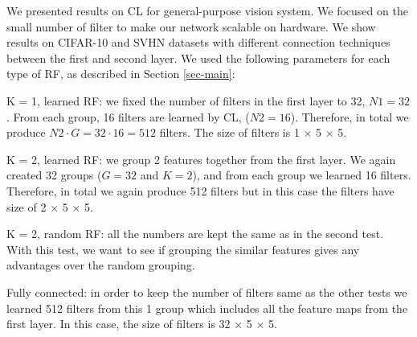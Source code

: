 \documentclass{article} %
\begin{document}
We presented results on CL for general-purpose vision system. We focused on the small number of filter to make our network scalable on hardware. We show results on CIFAR-10 and SVHN datasets with different connection techniques between the first and second layer.  We used the following parameters for each type of RF, as described in Section \ref{sec-main}:

K = 1, learned RF: we fixed the number of filters in the first layer to 32, $N1=32$. From each group, 16 filters are learned by CL, ($N2 = 16$). Therefore, in total we produce $N2 \cdot G = 32 \cdot 16 = 512$ filters. The size of filters is 1 $\times$ 5 $\times$ 5. 

K = 2, learned RF: we group 2 features together from the first layer. We again created 32 groups ($G = 32$ and $K = 2$), and from each group we learned 16 filters. Therefore, in total we again produce 512 filters but in this case the filters have size of 2 $\times$ 5 $\times$ 5. 

K = 2, random RF: all the numbers are kept the same as in the second test. With this test, we want to see if grouping the similar features gives any advantages over the random grouping.

Fully connected: in order to keep the number of filters same as the other tests we learned 512 filters from this 1 group which includes all the feature maps from the first layer. In this case, the size of filters is 32 $\times$ 5 $\times$ 5. 
\end{document}
